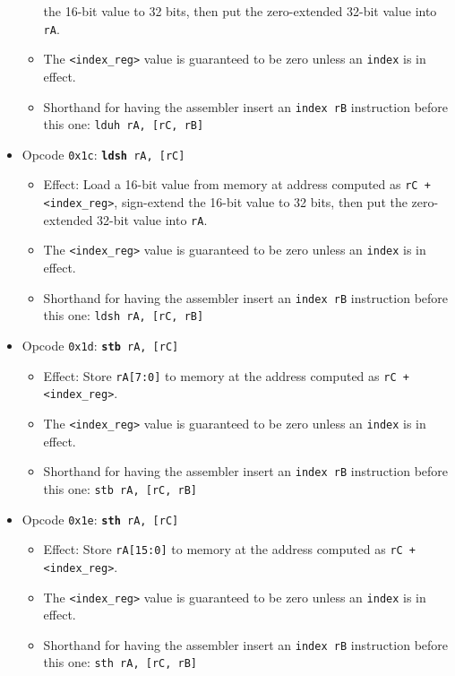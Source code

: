 \documentclass{article}
\begin{document}
\begin{itemize}
\begin{itemize}
			the 16-bit value to 32 bits, then put the zero-extended 32-bit
			value into \texttt{rA}.
			\item The \texttt{<index\_reg>} value is guaranteed to be zero
			unless an \texttt{index} is in effect.
			\item Shorthand for having the assembler insert an
			\texttt{index rB} instruction before this one:
				\texttt{lduh rA, [rC, rB]}
		\end{itemize}
		\item Opcode \texttt{0x1c}:
			\texttt{\textbf{ldsh} rA, [rC]}
		\begin{itemize}
			\item Effect:  Load a 16-bit value from memory at address
			computed as \texttt{rC + <index\_reg>}, sign-extend
			the 16-bit value to 32 bits, then put the zero-extended 32-bit
			value into \texttt{rA}.
			\item The \texttt{<index\_reg>} value is guaranteed to be zero
			unless an \texttt{index} is in effect.
			\item Shorthand for having the assembler insert an
			\texttt{index rB} instruction before this one:
				\texttt{ldsh rA, [rC, rB]}
		\end{itemize}
		\item Opcode \texttt{0x1d}:
			\texttt{\textbf{stb} rA, [rC]}
		\begin{itemize}
			\item Effect:  Store \texttt{rA[7:0]} to memory at the address
			computed as \texttt{rC + <index\_reg>}.
			\item The \texttt{<index\_reg>} value is guaranteed to be zero
			unless an \texttt{index} is in effect.
			\item Shorthand for having the assembler insert an
			\texttt{index rB} instruction before this one:
				\texttt{stb rA, [rC, rB]}
		\end{itemize}
		\item Opcode \texttt{0x1e}:
			\texttt{\textbf{sth} rA, [rC]}
		\begin{itemize}
			\item Effect:  Store \texttt{rA[15:0]} to memory at the address
			computed as \texttt{rC + <index\_reg>}.
			\item The \texttt{<index\_reg>} value is guaranteed to be zero
			unless an \texttt{index} is in effect.
			\item Shorthand for having the assembler insert an
			\texttt{index rB} instruction before this one:
				\texttt{sth rA, [rC, rB]}
		\end{itemize}

	\end{itemize}
\end{document}
